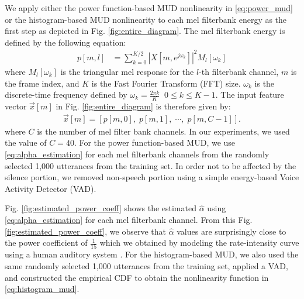 \documentclass[a4paper]{article}
\begin{document}
We apply either the 
power function-based MUD nonlinearity in \eqref{eq:power_mud} or the 
histogram-based MUD nonlinearity to each mel filterbank energy as the first
step as depicted in Fig. \ref{fig:entire_diagram}.
The mel filterbank energy is defined by the following equation:
\begin{align}
  p[m, l] & = 
    \sum_{k=0}^{K/2} \left|X[m, e^{j \omega_k}]\right|^2  M_l[\omega_k] 
  \label{eq:mel_filterbank_energy}
\end{align}
where $M_l[\omega_k]$ is the triangular mel response for the $l$-th
filterbank channel, $m$ is the frame index, and $K$ is the Fast Fourier
Transform (FFT) size. $\omega_k$ is the discrete-time frequency defined
by $\omega_k = \frac{2 \pi k}{K} \;\; 0 \le k \le K - 1$. 
The input feature vector $\vec{x}[m]$ in 
Fig. \ref{fig:entire_diagram} is therefore given by:
\begin{align}
  \vec{x}[m] = \left[p[m, 0], \; p[m, 1], \; \cdots, \; p[m, C-1] \right].
\end{align}
where $C$ is the number of mel filter bank channels. In our experiments, we
used the value of $C = 40$. For the power function-based MUD, we use 
\eqref{eq:alpha_estimation} for each mel filterbank channels from the 
randomly selected 1,000 utterances from the training set. In order not to
be affected by the silence portion, we removed non-speech portion using
a simple energy-based Voice Activity Detector (VAD). 

Fig.  \ref{fig:estimated_power_coeff} shows the estimated $\hat{\alpha}$ 
using \eqref{eq:alpha_estimation} for each mel filterbank channel.
From this Fig. \ref{fig:estimated_power_coeff}, we observe that 
$\hat{\alpha}$ values are surprisingly close to the power 
coefficient of $\frac{1}{15}$ which we obtained by modeling the rate-intensity 
curve using a human auditory system \cite{C_Kim_PhDThesis_2010,
C_Kim_IEEETran_2016_1}. 
For the histogram-based
MUD, we also used the same randomly selected 1,000 utterances from the 
training set, applied a VAD, and constructed the empirical CDF to
obtain the nonlinearity function in \eqref{eq:histogram_mud}.
\end{document}
